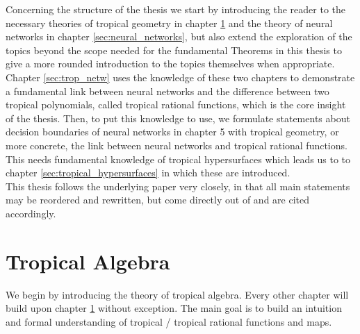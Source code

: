 \documentclass{article}
\theoremstyle{definition}
\begin{document}
Concerning the structure of the thesis we start by introducing the reader to the necessary theories of tropical geometry in chapter \ref{sec:trop_algebra} and the theory of neural networks in chapter \ref{sec:neural_networks}, but also extend the exploration of the topics beyond the scope needed for the fundamental Theorems in this thesis to give a more rounded introduction to the topics themselves when appropriate. Chapter \ref{sec:trop_netw} uses the knowledge of these two chapters to demonstrate a fundamental link between neural networks and the difference between two tropical polynomials, called tropical rational functions, which is the core insight of the thesis.
Then, to put this knowledge to use, we formulate statements about decision boundaries of neural networks in chapter 5 with tropical geometry, or more concrete, the link between neural networks and tropical rational functions. This needs fundamental knowledge of tropical hypersurfaces which leads us to to chapter \ref{sec:tropical_hypersurfaces} in which these are introduced. \\

This thesis follows the underlying paper \cite{maclagan2015introduction} very closely, in that all main statements may be reordered and rewritten, but come directly out of \cite{maclagan2015introduction} and are cited accordingly.

\newpage

\section{Tropical Algebra}
\label{sec:trop_algebra}
We begin by introducing the theory of tropical algebra. Every other chapter will build upon chapter \ref{sec:trop_algebra} without exception. The main goal is to build an intuition and formal understanding of tropical / tropical rational functions and maps. \\
\end{document}
